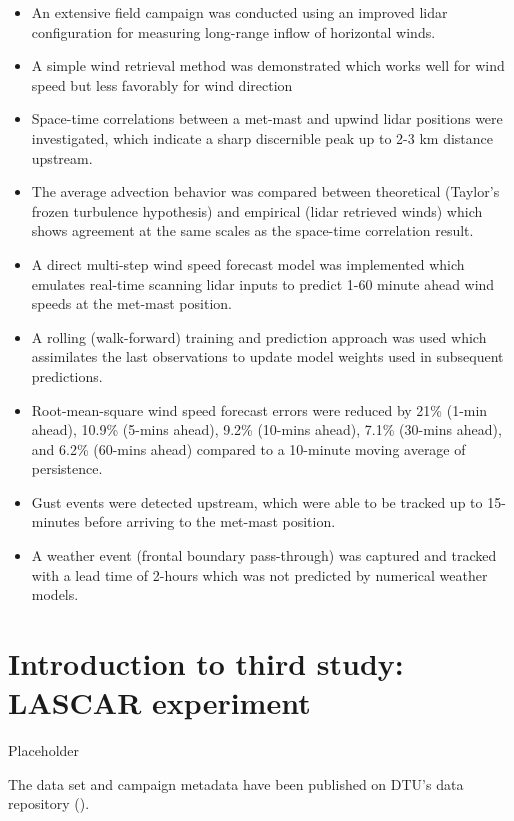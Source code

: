 \begin{itemize}
    \item An extensive field campaign was conducted using an improved lidar configuration for measuring long-range inflow of horizontal winds.
    \item A simple wind retrieval method was demonstrated which works well for wind speed but less favorably for wind direction
    \item Space-time correlations between a met-mast and upwind lidar positions were investigated, which indicate a sharp discernible peak up to 2-3 km distance upstream.
    \item The average advection behavior was compared between theoretical (Taylor's frozen turbulence hypothesis) and empirical (lidar retrieved winds) which shows agreement at the same scales as the space-time correlation result.
    \item A direct multi-step wind speed forecast model was implemented which emulates real-time scanning lidar inputs to predict 1-60 minute ahead wind speeds at the met-mast position.
    \item A rolling (walk-forward) training and prediction approach was used which assimilates the last observations to update model weights used in subsequent predictions.
    \item Root-mean-square wind speed forecast errors were reduced by 21\% (1-min ahead), 10.9\% (5-mins ahead), 9.2\% (10-mins ahead), 7.1\% (30-mins ahead), and 6.2\% (60-mins ahead) compared to a 10-minute moving average of persistence.
    \item Gust events were detected upstream, which were able to be tracked up to 15-minutes before arriving to the met-mast position.
    \item A weather event (frontal boundary pass-through) was captured and tracked with a lead time of 2-hours which was not predicted by numerical weather models.
    
\end{itemize}

\clearpage
\section{Introduction to third study: LASCAR experiment}
\label{sec:lascar_intro}

Placeholder

The data set and campaign metadata have been published on DTU's data repository (\cite{lascar_dataset}).

